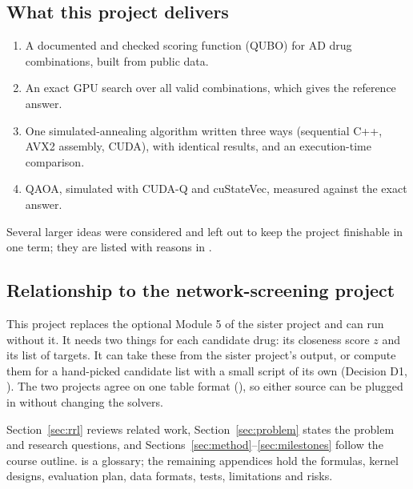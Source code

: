 \subsection{What this project delivers}

\begin{enumerate}
\item A documented and checked scoring function (QUBO) for AD drug combinations, built from public data.
\item An exact GPU search over all valid combinations, which gives the reference answer.
\item One simulated-annealing algorithm written three ways (sequential C++, AVX2 assembly, CUDA), with identical results, and an execution-time comparison.
\item QAOA, simulated with CUDA-Q and cuStateVec, measured against the exact answer.
\end{enumerate}
Several larger ideas were considered and left out to keep the project finishable in one term; they are listed with reasons in .

\subsection{Relationship to the network-screening project}

This project replaces the optional Module 5 of the sister project and can run without it. It needs two things for each candidate drug: its closeness score $z$ and its list of targets. It can take these from the sister project's output, or compute them for a hand-picked candidate list with a small script of its own (Decision D1, ). The two projects agree on one table format (), so either source can be plugged in without changing the solvers.

Section~\ref{sec:rrl} reviews related work, Section~\ref{sec:problem} states the problem and research questions, and Sections~\ref{sec:method}--\ref{sec:milestones} follow the course outline.  is a glossary; the remaining appendices hold the formulas, kernel designs, evaluation plan, data formats, tests, limitations and risks.

